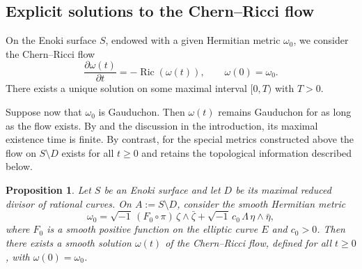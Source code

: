 \documentclass[12pt]{amsart}
\numberwithin{equation}{section}
\newtheorem{propo}{Proposition}
\theoremstyle{remark}
\theoremstyle{definition}
\begin{document}
\subsection{Explicit solutions to the Chern--Ricci flow}

On the Enoki surface $S$, endowed with a given Hermitian metric $\omega_0$, we consider the Chern--Ricci flow
$$ \frac{\partial\omega(t)}{\partial t}=-\operatorname{Ric}(\omega(t)), \qquad \omega(0)=\omega_0. $$
There exists a unique solution on some maximal interval $[0,T)$ with $T>0$.

Suppose now that $\omega_0$ is Gauduchon. Then $\omega(t)$ remains Gauduchon for as long as the flow exists. By \cite[Corollary 1.4]{tosatti-weinkove} and the discussion in the introduction, its maximal existence time is finite. By contrast, for the special metrics constructed above the flow on $S\setminus D$ exists for all $t\geq0$ and retains the topological information described below.

\begin{propo}\label{prop:crf}
Let $S$ be an Enoki surface and let $D$ be its maximal reduced divisor of rational curves. On $A:=S\setminus D$, consider the smooth Hermitian metric
$$ \omega_0 = \sqrt{-1}\, (F_0\circ\pi)\, \zeta\wedge\bar\zeta + \sqrt{-1}\, c_0\, \Lambda\, \eta\wedge\bar\eta, $$
where $F_0$ is a smooth positive function on the elliptic curve $E$ and $c_0>0$.
Then there exists a smooth solution $\omega(t)$ of the Chern--Ricci flow, defined for all $t \geq 0$, with $\omega(0)=\omega_0$.
\end{propo}
\end{document}
